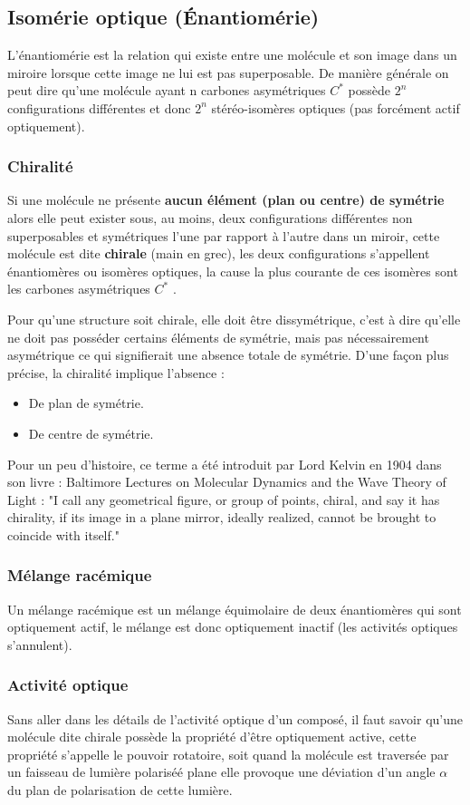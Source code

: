 \documentclass[a4paper, oneside]{book}
\begin{document}
\subsection{Isomérie optique (\'Enantiomérie)}
L'énantiomérie est la relation qui existe entre une molécule et son image dans un miroire lorsque cette image ne lui est pas superposable. De manière générale on peut dire qu'une molécule ayant n carbones asymétriques $C^*$ possède $2^n$ configurations différentes et donc $2^n$ stéréo-isomères optiques (pas forcément actif optiquement).
\subsubsection{Chiralité}
Si une molécule ne présente \textbf{aucun élément (plan ou centre) de symétrie} alors elle peut exister sous, au moins, deux configurations différentes non superposables et symétriques l'une par rapport à l'autre dans un miroir, cette molécule est dite \textbf{chirale} (main en grec), les deux configurations s'appellent énantiomères ou isomères optiques, la cause la plus courante de ces isomères sont les carbones asymétriques $C^*$ .

Pour qu'une structure soit chirale, elle doit être dissymétrique, c'est à dire qu'elle ne doit pas posséder certains éléments de symétrie, mais pas nécessairement asymétrique ce qui signifierait une absence totale de symétrie. D'une façon plus précise, la chiralité implique l'absence :\\
\begin{itemize}
    \item De plan de symétrie.
    \item De centre de symétrie.
\end{itemize}

Pour un peu d'histoire, ce terme a été introduit par Lord Kelvin en 1904 dans son livre : Baltimore Lectures on Molecular Dynamics and the Wave Theory of Light : "I call any geometrical figure, or group of points, chiral, and say it has chirality, if its image in a plane mirror, ideally realized, cannot be brought to coincide with itself."
\subsubsection{Mélange racémique}
Un mélange racémique est un mélange équimolaire de deux énantiomères qui sont optiquement actif, le mélange est donc optiquement inactif (les activités optiques s'annulent).
\subsubsection{Activité optique}
Sans aller dans les détails de l'activité optique d'un composé, il faut savoir qu'une molécule dite chirale possède la propriété d'être optiquement active, cette propriété s'appelle le pouvoir rotatoire, soit quand la molécule est traversée par un faisseau de lumière polariséé plane elle provoque une déviation d'un angle $\alpha$ du plan de polarisation de cette lumière.
\end{document}
